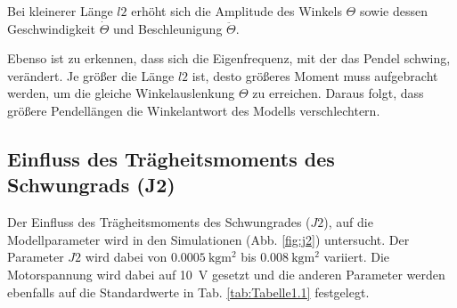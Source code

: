 Bei kleinerer Länge $l2$ erhöht sich die Amplitude des Winkels $\Theta$ sowie dessen Geschwindigkeit $\dot\Theta$ und Beschleunigung $\ddot\Theta$. 

Ebenso ist zu erkennen, dass sich die Eigenfrequenz, mit der das Pendel schwing, verändert.
Je größer die Länge $l2$ ist, desto größeres Moment muss aufgebracht werden, um die gleiche Winkelauslenkung $\Theta$ zu erreichen. 
Daraus folgt, dass größere Pendellängen die Winkelantwort des Modells verschlechtern. 

\subsection*{Einfluss des Trägheitsmoments des Schwungrads (J2)}
Der Einfluss des Trägheitsmoments des Schwungrades ($J2$), auf die Modellparameter wird in den Simulationen (Abb. \ref{fig:j2}) untersucht. 
Der Parameter $J2$ wird dabei von $\SI{0.0005}{\kg\m^2}$ bis $\SI{0.008}{\kg\m^2}$ variiert.
Die Motorspannung wird dabei auf \SI{10}{\volt} gesetzt und die anderen Parameter werden ebenfalls auf die Standardwerte in Tab. \ref{tab:Tabelle1.1} festgelegt.\\
\pagebreak

